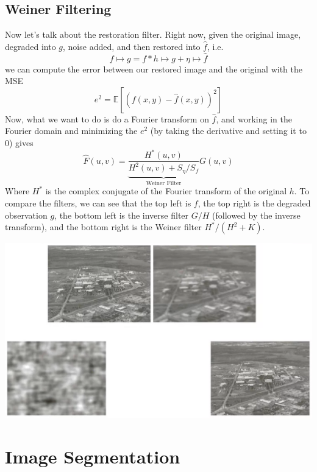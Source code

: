\documentclass{article}
\begin{document}
  \subsection{Weiner Filtering}

    Now let's talk about the restoration filter. Right now, given the original image, degraded into $g$, noise added, and then restored into $\hat{f}$, i.e. 
    \[f \mapsto g = f \ast h \mapsto g + \eta \mapsto \hat{f}\]
    we can compute the error between our restored image and the original with the MSE 
    \[e^2 = \mathbb{E}[ ( f(x, y) - \hat{f}(x, y))^2]\]
    Now, what we want to do is do a Fourier transform on $\hat{f}$, and working in the Fourier domain and minimizing the $e^2$ (by taking the derivative and setting it to $0$) gives 
    \[\hat{F}(u, v) = \underbrace{\frac{H^\ast (u, v)}{H^2 (u, v) + S_\eta / S_f}}_{\text{Weiner Filter}} G(u, v)\]
    Where $H^\ast$ is the complex conjugate of the Fourier transform of the original $h$. To compare the filters, we can see that the top left is $f$, the top right is the degraded observation $g$, the bottom left is the inverse filter $G/H$ (followed by the inverse transform), and the bottom right is the Weiner filter $H^\ast / (H^2 + K)$. 
    \begin{center}
        \includegraphics[scale=0.3]{img/filter_comparison.png}
    \end{center}

\section{Image Segmentation}
\end{document}
